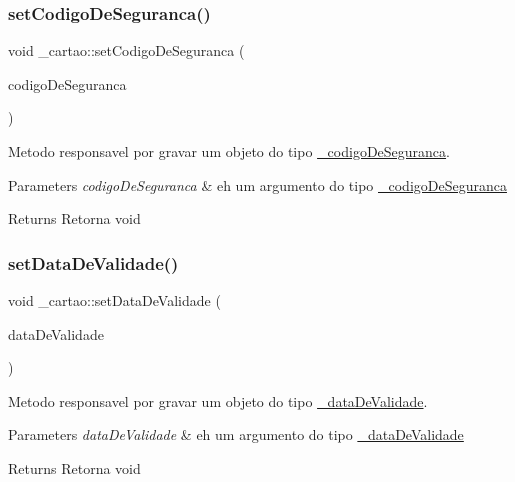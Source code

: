 \subsubsection{\texorpdfstring{setCodigoDeSeguranca()}{setCodigoDeSeguranca()}}
{\footnotesize\ttfamily void \+\_\+cartao\+::set\+Codigo\+De\+Seguranca (\begin{DoxyParamCaption}\item[{const \mbox{\hyperlink{class__codigo_de_seguranca}{\+\_\+codigo\+De\+Seguranca}} \&}]{codigo\+De\+Seguranca }\end{DoxyParamCaption})}



Metodo responsavel por gravar um objeto do tipo \mbox{\hyperlink{class__codigo_de_seguranca}{\+\_\+codigo\+De\+Seguranca}}. 


\begin{DoxyParams}{Parameters}
{\em codigo\+De\+Seguranca} & eh um argumento do tipo \mbox{\hyperlink{class__codigo_de_seguranca}{\+\_\+codigo\+De\+Seguranca}} \\
\hline
\end{DoxyParams}
\begin{DoxyReturn}{Returns}
Retorna void 
\end{DoxyReturn}
\mbox{\label{class__cartao_a2b21966a565326b330d43cf4e01bfa6b}} 
\subsubsection{\texorpdfstring{setDataDeValidade()}{setDataDeValidade()}}
{\footnotesize\ttfamily void \+\_\+cartao\+::set\+Data\+De\+Validade (\begin{DoxyParamCaption}\item[{const \mbox{\hyperlink{class__data_de_validade}{\+\_\+data\+De\+Validade}} \&}]{data\+De\+Validade }\end{DoxyParamCaption})}



Metodo responsavel por gravar um objeto do tipo \mbox{\hyperlink{class__data_de_validade}{\+\_\+data\+De\+Validade}}. 


\begin{DoxyParams}{Parameters}
{\em data\+De\+Validade} & eh um argumento do tipo \mbox{\hyperlink{class__data_de_validade}{\+\_\+data\+De\+Validade}} \\
\hline
\end{DoxyParams}
\begin{DoxyReturn}{Returns}
Retorna void 
\end{DoxyReturn}
\mbox{\label{class__cartao_a3ffa86a6968da810868217e983ff6fbf}} 
